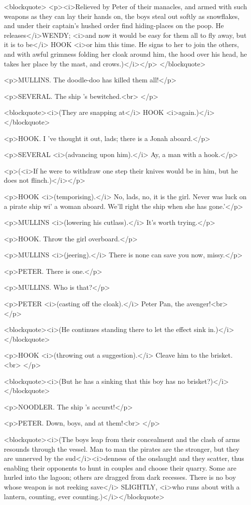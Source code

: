 <blockquote>
<p><i>Relieved by Peter of their manacles, and armed with such
weapons as they can lay their hands on, the boys steal out softly as
snowflakes, and under their captain's hushed order find hiding-places
on the poop. He releases</i>WENDY; <i>and now it would be easy for
them all to fly away, but it is to be</i> HOOK <i>or him this time.
He signs to her to join the others, and with awful grimness folding
her cloak around him, the hood over his head, he takes her place by
the mast, and crows.)</i></p>
</blockquote>

<p>MULLINS. The doodle-doo has killed them all!</p>

<p>SEVERAL. The ship 's bewitched.<br>
</p>

<blockquote><i>(They are snapping at</i> HOOK
<i>again.)</i></blockquote>

<p>HOOK. I 've thought it out, lads; there is a Jonah aboard.</p>

<p>SEVERAL <i>(advancing upon him).</i> Ay, a man with a hook.</p>

<p>(<i>If he were to withdraw one step their knives would be in him,
but he does not flinch.)</i></p>

<p>HOOK <i>(temporising).</i> No, lads, no, it is the girl. Never was
luck on a pirate ship wi' a woman aboard. We'll right the ship when
she has gone.'</p>

<p>MULLINS <i>(lowering his cutlass).</i> It's worth trying.</p>

<p>HOOK. Throw the girl overboard.</p>

<p>MULLINS <i>(jeering).</i> There is none can save you now,
missy.</p>

<p>PETER. There is one.</p>

<p>MULLINS. Who is that?</p>

<p>PETER <i>(casting off the cloak).</i> Peter Pan, the avenger!<br>
</p>

<blockquote><i>(He continues standing there to let the effect sink
in.)</i></blockquote>

<p>HOOK <i>(throwing out a suggestion).</i> Cleave him to the
brisket.<br>
</p>

<blockquote><i>(But he has a sinking that this boy has no
brisket?)</i></blockquote>

<p>NOODLER. The ship 's accurst!</p>

<p>PETER. Down, boys, and at them!<br>
</p>

<blockquote><i>(The boys leap from their concealment and the clash of
arms resounds through the vessel. Man to man the pirates are the
stronger, but they are unnerved by the sud</i><i>denness of the
onslaught and they scatter, thus enabling their opponents to hunt in
couples and choose their quarry. Some are hurled into the lagoon;
others are dragged from dark recesses. There is no boy whose weapon
is not reeking save</i> SLIGHTLY, <i>who runs about with a lantern,
counting, ever counting.)</i></blockquote>

